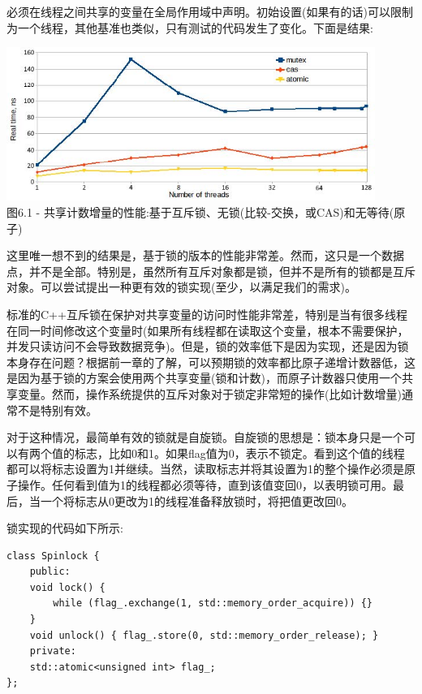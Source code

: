必须在线程之间共享的变量在全局作用域中声明。初始设置(如果有的话)可以限制为一个线程，其他基准也类似，只有测试的代码发生了变化。下面是结果:

\begin{center}
\includegraphics[width=0.9\textwidth]{content/2/chapter6/images/1.jpg}\\
图6.1 - 共享计数增量的性能:基于互斥锁、无锁(比较-交换，或CAS)和无等待(原子)
\end{center}

这里唯一想不到的结果是，基于锁的版本的性能非常差。然而，这只是一个数据点，并不是全部。特别是，虽然所有互斥对象都是锁，但并不是所有的锁都是互斥对象。可以尝试提出一种更有效的锁实现(至少，以满足我们的需求)。


标准的C++互斥锁在保护对共享变量的访问时性能非常差，特别是当有很多线程在同一时间修改这个变量时(如果所有线程都在读取这个变量，根本不需要保护，并发只读访问不会导致数据竞争)。但是，锁的效率低下是因为实现，还是因为锁本身存在问题？根据前一章的了解，可以预期锁的效率都比原子递增计数器低，这是因为基于锁的方案会使用两个共享变量(锁和计数)，而原子计数器只使用一个共享变量。然而，操作系统提供的互斥对象对于锁定非常短的操作(比如计数增量)通常不是特别有效。

对于这种情况，最简单有效的锁就是自旋锁。自旋锁的思想是：锁本身只是一个可以有两个值的标志，比如0和1。如果flag值为0，表示不锁定。看到这个值的线程都可以将标志设置为1并继续。当然，读取标志并将其设置为1的整个操作必须是原子操作。任何看到值为1的线程都必须等待，直到该值变回0，以表明锁可用。最后，当一个将标志从0更改为1的线程准备释放锁时，将把值更改回0。

锁实现的代码如下所示:

\begin{lstlisting}[style=styleCXX]
class Spinlock {
	public:
	void lock() {
		while (flag_.exchange(1, std::memory_order_acquire)) {}
	}
	void unlock() { flag_.store(0, std::memory_order_release); }
	private:
	std::atomic<unsigned int> flag_;
};
\end{lstlisting}

